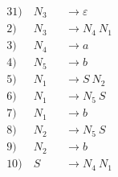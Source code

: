 \begin{alignat*}{3}
1) \ & N_3 &&\rightarrow \varepsilon \\
2) \ & N_3 &&\rightarrow N_4\ N_1 \\
3) \ & N_4 &&\rightarrow a \\
4) \ & N_5 &&\rightarrow b \\
5) \ & N_1 &&\rightarrow S\ N_2 \\
6) \ & N_1 &&\rightarrow N_5\ S \\
7) \ & N_1 &&\rightarrow b \\
8) \ & N_2 &&\rightarrow N_5\ S \\
9) \ & N_2 &&\rightarrow b \\
10) \ & S &&\rightarrow N_4\ N_1 \\
\end{alignat*}